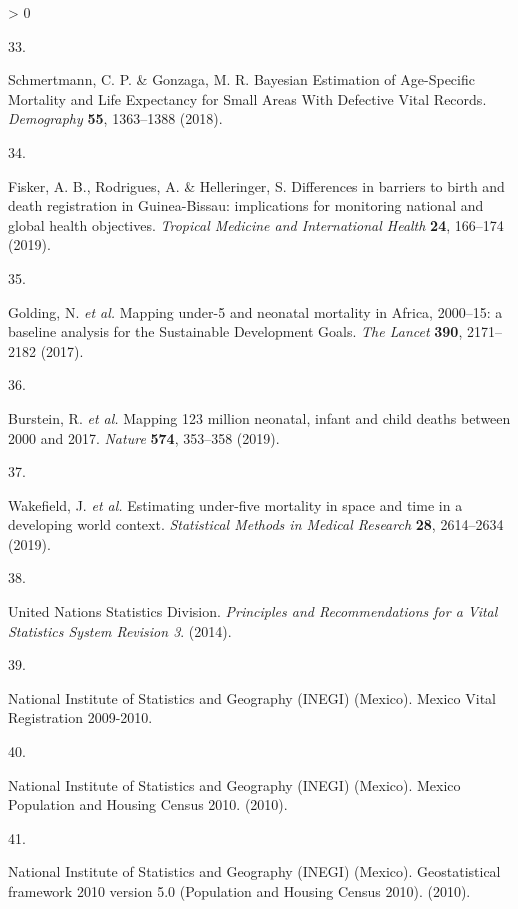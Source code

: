 \documentclass[
]{article}
\newlength{\cslhangindent}
\newlength{\csllabelwidth}
\newenvironment{CSLReferences}[2] %
 {%
  \setlength{\parindent}{0pt}
  \ifodd #1 \everypar{\setlength{\hangindent}{\cslhangindent}}\ignorespaces\fi
  \ifnum #2 > 0
  \setlength{\parskip}{#2\baselineskip}
  \fi
 }%
 {}
\newcommand{\CSLLeftMargin}[1]{\parbox[t]{\csllabelwidth}{#1}}
\newcommand{\CSLRightInline}[1]{\parbox[t]{\linewidth - \csllabelwidth}{#1}\break}
\begin{document}
\begin{CSLReferences}{0}{0}
\leavevmode\hypertarget{ref-Schmertmann2018a}{}%
\CSLLeftMargin{33. }
\CSLRightInline{Schmertmann, C. P. \& Gonzaga, M. R. {Bayesian Estimation of Age-Specific Mortality and Life Expectancy for Small Areas With Defective Vital Records}. \emph{Demography} \textbf{55}, 1363--1388 (2018).}

\leavevmode\hypertarget{ref-Fisker2019}{}%
\CSLLeftMargin{34. }
\CSLRightInline{Fisker, A. B., Rodrigues, A. \& Helleringer, S. {Differences in barriers to birth and death registration in Guinea-Bissau: implications for monitoring national and global health objectives}. \emph{Tropical Medicine and International Health} \textbf{24}, 166--174 (2019).}

\leavevmode\hypertarget{ref-Golding2017}{}%
\CSLLeftMargin{35. }
\CSLRightInline{Golding, N. \emph{et al.} {Mapping under-5 and neonatal mortality in Africa, 2000--15: a baseline analysis for the Sustainable Development Goals}. \emph{The Lancet} \textbf{390}, 2171--2182 (2017).}

\leavevmode\hypertarget{ref-Burstein2019}{}%
\CSLLeftMargin{36. }
\CSLRightInline{Burstein, R. \emph{et al.} {Mapping 123 million neonatal, infant and child deaths between 2000 and 2017}. \emph{Nature} \textbf{574}, 353--358 (2019).}

\leavevmode\hypertarget{ref-Wakefield2019}{}%
\CSLLeftMargin{37. }
\CSLRightInline{Wakefield, J. \emph{et al.} {Estimating under-five mortality in space and time in a developing world context}. \emph{Statistical Methods in Medical Research} \textbf{28}, 2614--2634 (2019).}

\leavevmode\hypertarget{ref-UnitedNationsStatisticsDivision2014}{}%
\CSLLeftMargin{38. }
\CSLRightInline{United Nations Statistics Division. \emph{{Principles and Recommendations for a Vital Statistics System Revision 3}}. (2014).}

\leavevmode\hypertarget{ref-INEGI2010}{}%
\CSLLeftMargin{39. }
\CSLRightInline{National Institute of Statistics and Geography (INEGI) (Mexico). {Mexico Vital Registration 2009-2010}.}

\leavevmode\hypertarget{ref-INEGI2010a}{}%
\CSLLeftMargin{40. }
\CSLRightInline{National Institute of Statistics and Geography (INEGI) (Mexico). {Mexico Population and Housing Census 2010}. (2010).}

\leavevmode\hypertarget{ref-INEGI2010b}{}%
\CSLLeftMargin{41. }
\CSLRightInline{National Institute of Statistics and Geography (INEGI) (Mexico). {Geostatistical framework 2010 version 5.0 (Population and Housing Census 2010)}. (2010).}


\end{CSLReferences}
\end{document}

